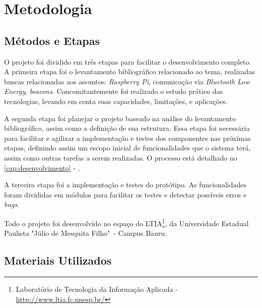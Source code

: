 \chapter{Metodologia}\label{cap:metodologia}

\section{Métodos e Etapas}\label{sec:metodos-etapas}

O projeto foi dividido em três etapas para facilitar o desenvolvimento completo. A primeira etapa foi o levantamento bibliográfico relacionado ao tema, realizadas buscas relacionadas aos assuntos: \textit{Raspberry Pi}, comunicação via \textit{Bluetooth Low Energy}, \textit{beacons}. Concomitantemente foi realizado o estudo prático das tecnologias, levando em conta suas capacidades, limitações, e aplicações.

A segunda etapa foi planejar o projeto baseado na análise do levantamento bibliográfico, assim como a definição de sua estrutura. Essa etapa foi necessária para facilitar e agilizar a implementação e testes dos componentes nas próximas etapas, definindo assim um escopo inicial de funcionalidades que o sistema terá, assim como outras tarefas a serem realizadas. O processo está detalhado no \autoref{cap:desenvolvimento} - .

A terceira etapa foi a implementação e testes do protótipo. As funcionalidades foram divididas em módulos para facilitar os testes e detectar possíveis erros e \textit{bugs}.

Todo o projeto foi desenvolvido no espaço do LTIA\footnote{Laboratório de Tecnologia da Informação Aplicada - \url{http://www.ltia.fc.unesp.br/}}, da Universidade Estadual Paulista "Júlio de Mesquita Filho"\ - Campus Bauru.


\section{Materiais Utilizados}\label{sec:materiais-utilizados}

